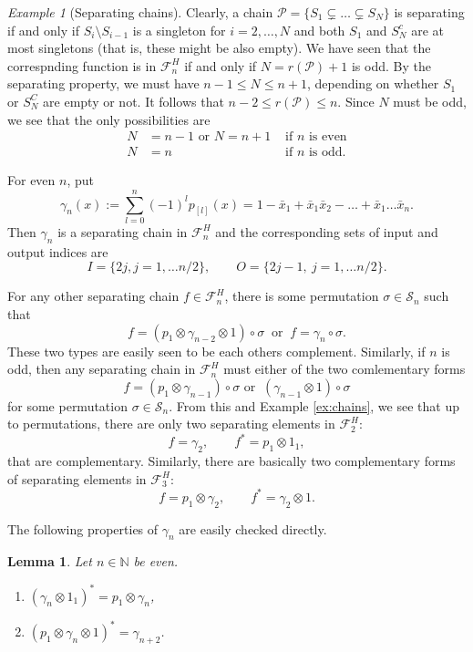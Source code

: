 \documentclass[12pt]{article}
\newtheorem{lemma}{Lemma}
\theoremstyle{definition}
\theoremstyle{remark}
\newtheorem{example}{Example}
\def\perm{\mathcal S}
\def\Pe{\mathcal P}
\def\Fe{\mathcal F}
\begin{document}
\begin{example}[Separating chains] Clearly, a chain $\Pe=\{S_1\subsetneq \dots \subsetneq
S_N\}$ is
separating if and only if  $S_i\setminus S_{i-1}$ is a singleton for $i=2,\dots, N$ and
both $S_1$ and $S_N^c$ are at most singletons (that is, these might be also empty). 
We have seen that the correspnding function is in $\Fe_n^H$ if and only if $N=r(\Pe)+1$ is
odd. By the separating property, we must have $n-1\le N\le n+1$, depending on whether
$S_1$ or $S_N^C$ are empty or not.
It follows that $n-2\le r(\Pe)\le n$. Since $N$ must be  odd, we see that the only
possibilities are
\begin{align*}
N&=n-1 \text{ or } N=n+1  & \text{ if $n$ is even}\\
N&=n & \text{ if $n$ is odd}.
\end{align*}

For even $n$, put
\[
\gamma_n(x):=\sum_{l=0}^n (-1)^lp_{[l]}(x)=1-\bar x_1+\bar x_1\bar x_2-\dots +\bar x_1\dots \bar x_n.
\]
Then $\gamma_n$  is a separating chain in $\Fe_n^H$ and the corresponding sets of input and output
indices  are
\[
I=\{2j, j=1,\dots n/2\},\qquad O=\{2j-1,\ j=1,\dots n/2\}.
\]

For any other separating
chain $f\in \Fe_n^H$, there is some permutation $\sigma\in \perm_n$ such that
\[
f=(p_1\otimes \gamma_{n-2}\otimes 1)\circ \sigma\ \text{ or }\  f=\gamma_n\circ \sigma.
\]
These two types are easily seen to be each others complement.
Similarly, if $n$ is odd, then any separating chain in $\Fe_n^H$  must either of the two
comlementary  forms
\[
f=(p_1\otimes \gamma_{n-1})\circ \sigma  \text{ or }\  (\gamma_{n-1}\otimes 1)\circ
\sigma
\]
for some permutation $\sigma\in \perm_n$.  From this and Example \ref{ex:chains}, we see
that up to permutations, there are  only two separating elements in $\Fe_2^H$:  
\[
f=\gamma_2,\qquad f^*=p_1\otimes 1_1,
\]
that are complementary. Similarly, there are basically 
two complementary forms of  separating elements in $\Fe_3^H$: 
\[
f=p_1\otimes \gamma_2,\qquad f^*= \gamma_2\otimes 1. 
\]


\end{example}

The following properties of $\gamma_n$ are easily checked directly.

\begin{lemma}\label{lemma:gamma} Let $n\in \mathbb N$ be even.
\begin{enumerate}
\item[(i)] $(\gamma_n\otimes 1_1)^*=p_1\otimes \gamma_n$,
\item[(ii)] $(p_1\otimes\gamma_n \otimes 1)^*=\gamma_{n+2}$.
\end{enumerate}


\end{lemma}
\end{document}
